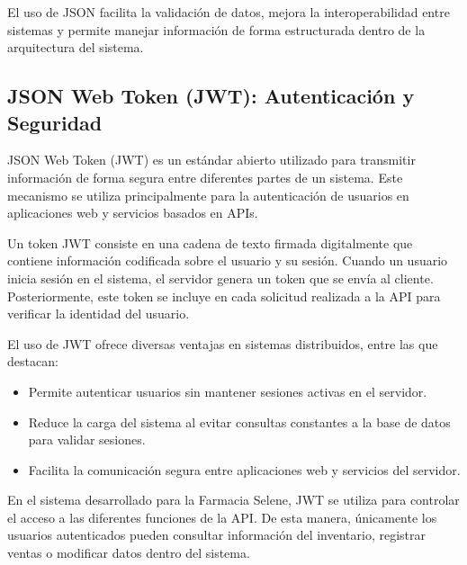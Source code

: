 El uso de JSON facilita la validación de datos, mejora la interoperabilidad entre sistemas y permite manejar información de forma estructurada dentro de la arquitectura del sistema.

\subsection{JSON Web Token (JWT): Autenticación y Seguridad}

JSON Web Token (JWT) es un estándar abierto utilizado para transmitir información de forma segura entre diferentes partes de un sistema. Este mecanismo se utiliza principalmente para la autenticación de usuarios en aplicaciones web y servicios basados en APIs.

Un token JWT consiste en una cadena de texto firmada digitalmente que contiene información codificada sobre el usuario y su sesión. Cuando un usuario inicia sesión en el sistema, el servidor genera un token que se envía al cliente. Posteriormente, este token se incluye en cada solicitud realizada a la API para verificar la identidad del usuario.

El uso de JWT ofrece diversas ventajas en sistemas distribuidos, entre las que destacan:

\begin{itemize}
\item Permite autenticar usuarios sin mantener sesiones activas en el servidor.
\item Reduce la carga del sistema al evitar consultas constantes a la base de datos para validar sesiones.
\item Facilita la comunicación segura entre aplicaciones web y servicios del servidor.
\end{itemize}

En el sistema desarrollado para la Farmacia Selene, JWT se utiliza para controlar el acceso a las diferentes funciones de la API. De esta manera, únicamente los usuarios autenticados pueden consultar información del inventario, registrar ventas o modificar datos dentro del sistema.

